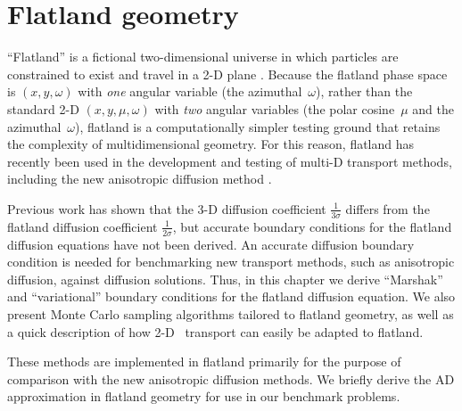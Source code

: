 
\chapter{Flatland geometry}\label{chap:flatland}

``Flatland'' is a fictional two-dimensional universe in which particles are
constrained to exist and
travel in a 2-D plane \cite{Asa2008}. Because the flatland phase space is
$(x,y,\omega)$ with \emph{one} angular variable (the azimuthal~$\omega$),
rather than the
standard 2-D $(x,y,\mu,\omega)$ with \emph{two} angular variables (the
polar cosine~$\mu$ and the azimuthal~$\omega$),
flatland is a computationally simpler testing ground that retains the
complexity of multidimensional geometry. For this reason, flatland has recently
been used in the development and testing of multi-D transport methods, including
the new anisotropic diffusion method \cite{Lar2009c,Bor2010,Joh2011,Tra2011}.

Previous work has shown that the 3-D diffusion coefficient
$\frac{1}{3\sigma}$ differs from the flatland diffusion coefficient
$\frac{1}{2\sigma}$, but accurate boundary conditions for the flatland
diffusion equations have not been derived. An accurate diffusion
boundary condition is needed for benchmarking new transport methods, such as
anisotropic diffusion, against
diffusion solutions. Thus, in this chapter we derive ``Marshak''
and ``variational'' boundary conditions for the flatland diffusion equation.
We also present Monte Carlo sampling algorithms tailored to flatland
geometry, as well as a quick description of how 2-D \SN\ transport can easily be
adapted to flatland.

These methods are implemented in flatland primarily for the purpose of
comparison with the new anisotropic diffusion methods. We briefly derive the
AD approximation in flatland geometry for use in our benchmark problems.

%

